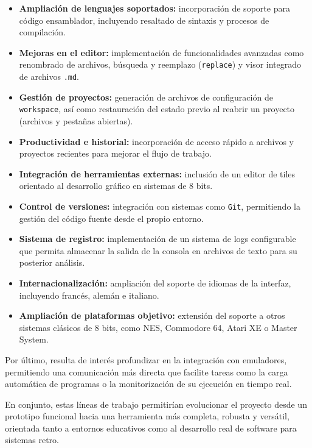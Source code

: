 \documentclass[../../main.tex]{subfiles}
\begin{document}
\begin{itemize}
    \item \textbf{Ampliación de lenguajes soportados:} incorporación de soporte para código ensamblador, incluyendo resaltado de sintaxis y procesos de compilación.
    \item \textbf{Mejoras en el editor:} implementación de funcionalidades avanzadas como renombrado de archivos, búsqueda y reemplazo (\lstinline|replace|) y visor integrado de archivos \lstinline|.md|.
    \item \textbf{Gestión de proyectos:} generación de archivos de configuración de \lstinline|workspace|, así como restauración del estado previo al reabrir un proyecto (archivos y pestañas abiertas).
    \item \textbf{Productividad e historial:} incorporación de acceso rápido a archivos y proyectos recientes para mejorar el flujo de trabajo.
    \item \textbf{Integración de herramientas externas:} inclusión de un editor de tiles orientado al desarrollo gráfico en sistemas de 8 bits.
    \item \textbf{Control de versiones:} integración con sistemas como \lstinline|Git|, permitiendo la gestión del código fuente desde el propio entorno.
    \item \textbf{Sistema de registro:} implementación de un sistema de logs configurable que permita almacenar la salida de la consola en archivos de texto para su posterior análisis.
    \item \textbf{Internacionalización:} ampliación del soporte de idiomas de la interfaz, incluyendo francés, alemán e italiano.
    \item \textbf{Ampliación de plataformas objetivo:} extensión del soporte a otros sistemas clásicos de 8 bits, como NES, Commodore 64, Atari XE o Master System.
\end{itemize}

Por último, resulta de interés profundizar en la integración con emuladores, permitiendo una comunicación más directa que facilite tareas como la carga automática de programas o la monitorización de su ejecución en tiempo real.

En conjunto, estas líneas de trabajo permitirían evolucionar el proyecto desde un prototipo funcional hacia una herramienta más completa, robusta y versátil, orientada tanto a entornos educativos como al desarrollo real de software para sistemas retro.
\end{document}
